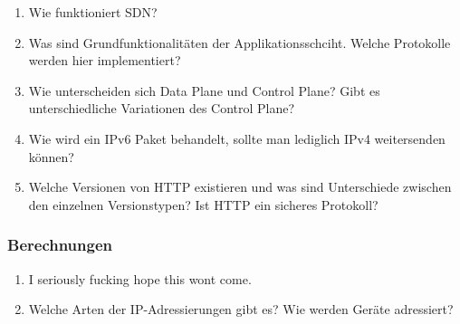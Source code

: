 \documentclass{article}
\begin{document}
\begin{enumerate}
        \item Wie funktioniert SDN?
        \item Was sind Grundfunktionalitäten der Applikationsschciht. Welche Protokolle werden hier implementiert?
        \item Wie unterscheiden sich Data Plane und Control Plane? Gibt es unterschiedliche Variationen des Control Plane?
        \item Wie wird ein IPv6 Paket behandelt, sollte man lediglich IPv4 weitersenden können?
        \item Welche Versionen von HTTP existieren und was sind Unterschiede zwischen den einzelnen Versionstypen? Ist HTTP ein sicheres Protokoll?
    \end{enumerate}
    \subsubsection{Berechnungen}
    \begin{enumerate}
        \item I seriously fucking hope this wont come.
        \item Welche Arten der IP-Adressierungen gibt es? Wie werden Geräte adressiert? %
    \end{enumerate}
\end{document}
